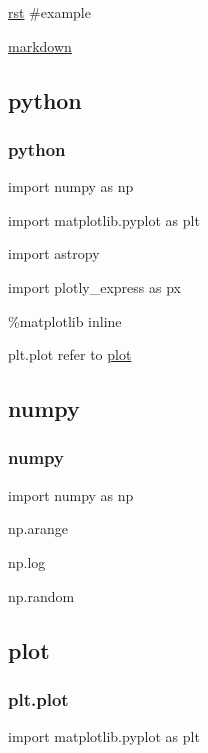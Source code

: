 \documentclass[letterpaper,10pt,english]{sphinxmanual}
\begin{document}
\href{https://zh-sphinx-doc.readthedocs.io/en/latest/rest.html}{rst} \#example

\href{https://guides.github.com/features/mastering-markdown/}{markdown}


\subsection{python}
\label{\detokenize{base/02_ipython:python}}\label{\detokenize{base/02_ipython:markdown}}\label{\detokenize{base/02_ipython::doc}}

\subsubsection{python}
\label{\detokenize{base/02_ipython:id1}}
import numpy as np

import matplotlib.pyplot as plt

import astropy

import plotly\_express as px

\%matplotlib inline

plt.plot refer to \href{https://matplotlib.org/users/pyplot\_tutorial.html}{plot}


\subsection{numpy}
\label{\detokenize{base/03_numpy:plot}}\label{\detokenize{base/03_numpy::doc}}\label{\detokenize{base/03_numpy:numpy}}

\subsubsection{numpy}
\label{\detokenize{base/03_numpy:id1}}
import numpy as np

np.arange

np.log

np.random


\subsection{plot}
\label{\detokenize{base/04_matplotlib:plot}}\label{\detokenize{base/04_matplotlib::doc}}

\subsubsection{plt.plot}
\label{\detokenize{base/04_matplotlib:plt-plot}}
import matplotlib.pyplot as plt
\end{document}
